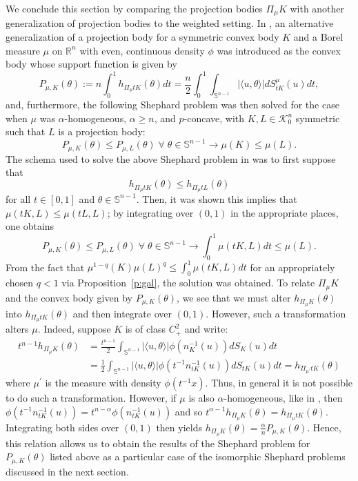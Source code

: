 \documentclass[11pt]{amsart}
\theoremstyle{definition}
\theoremstyle{remark}
\numberwithin{equation}{section}
\newcommand{\R}{\mathbb{R}}
\newcommand{\s}{\mathbb{S}}
\newcommand{\conbod}{\mathcal{K}^n}
\begin{document}
We conclude this section by comparing the projection bodies $\Pi_\mu K$ with another generalization of projection bodies to the weighted setting. In \cite{GAL19}, an alternative generalization of a projection body for a symmetric convex body $K$ and a Borel measure $\mu$ on $\R^n$ with even, continuous density $\phi$ was introduced as the convex body whose support function is given by 
$$P_{\mu,K}(\theta):=n\int_0^1 h_{\Pi_\mu tK}(\theta) dt=\frac{n}{2}\int_0^1\int_{\s^{n-1}}|\langle u,\theta \rangle|dS^{\mu}_{tK}(u)dt,$$
and, furthermore, the following Shephard problem was then solved for the case when $\mu$ was $\alpha$-homogeneous, $\alpha \geq n$, and $p$-concave, with $K,L\in\conbod_0$ symmetric such that $L$ is a projection body:
$$P_{\mu,K}(\theta) \leq P_{\mu,L}(\theta) \; \forall \; \theta\in\s^{n-1}\longrightarrow \mu(K)\leq \mu(L).$$
The schema used to solve the above Shephard problem in \cite{GAL19} was to first suppose that
$$h_{\Pi_\mu tK}(\theta)\leq h_{\Pi_\mu tL}(\theta)$$
for all $t\in[0,1]$ and $\theta\in\s^{n-1}.$ Then, it was shown this implies that $\mu(tK,L)\leq \mu(tL,L)$; by integrating over $(0,1)$ in the appropriate places, one obtains
$$P_{\mu,K}(\theta) \leq P_{\mu,L}(\theta) \; \forall \; \theta\in\s^{n-1} \longrightarrow \int_0^1\mu(tK,L)dt\leq \mu(L).$$
From the fact that $\mu^{1-q}(K)\mu(L)^q\leq \int_0^1\mu(tK,L)dt$ for an appropriately chosen $q<1$ via Proposition~\ref{p:gal}, the solution was obtained. To relate $\Pi_\mu K$ and the convex body given by $P_{\mu,K}(\theta)$, we see that we must alter $h_{\Pi_\mu K}(\theta)$ into $h_{\Pi_\mu tK}(\theta)$ and then integrate over $(0,1)$. However, such a transformation alters $\mu.$ Indeed, suppose $K$ is of class $C^2_+$ and write:
\begin{align*}
t^{n-1}h_{\Pi_\mu K}(\theta)&=\frac{t^{n-1}}{2}\int_{\s^{n-1}}|\langle u,\theta \rangle|\phi\left(n_{K}^{-1}(u)\right)dS_{K}(u)dt
\\
&=\frac{1}{2}\int_{\s^{n-1}}|\langle u,\theta \rangle|\phi\left(t^{-1}n_{tK}^{-1}(u)\right)dS_{tK}(u)dt=h_{\Pi_{\mu^\prime}tK}(\theta)
\end{align*}
where $\mu^\prime$ is the measure with density $\phi(t^{-1}x).$ Thus, in general it is not possible to do such a transformation. However, if $\mu$ is also $\alpha$-homogeneous, like in \cite{GAL19}, then $\phi\left(t^{-1}n_{tK}^{-1}(u)\right)=t^{n-\alpha}\phi\left(n_{tK}^{-1}(u)\right)$ and so
$t^{\alpha-1}h_{\Pi_\mu K}(\theta)=h_{\Pi_\mu tK}(\theta)$. Integrating both sides over $(0,1)$ then yields
$h_{\Pi_\mu K}(\theta)=\frac{\alpha}{n}P_{\mu,K}(\theta).$
Hence, this relation allows us to obtain the results of the Shephard problem for $P_{\mu,K}(\theta)$ listed above as a particular case of the isomorphic Shephard problems discussed in the next section.
\end{document}
